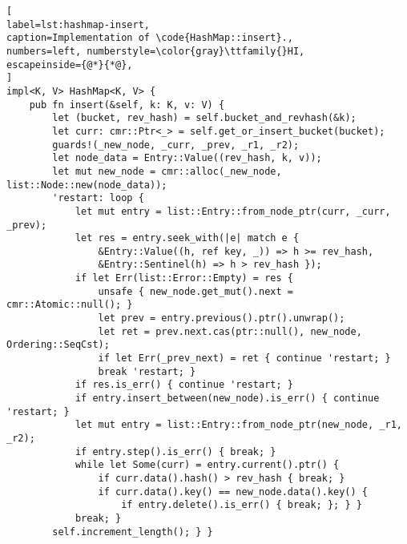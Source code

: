 \begin{lstlisting}[
label=lst:hashmap-insert,
caption=Implementation of \code{HashMap::insert}.,
numbers=left, numberstyle=\color{gray}\ttfamily{}HI,
escapeinside={@*}{*@},
]
impl<K, V> HashMap<K, V> {
    pub fn insert(&self, k: K, v: V) {
        let (bucket, rev_hash) = self.bucket_and_revhash(&k);
        let curr: cmr::Ptr<_> = self.get_or_insert_bucket(bucket);
        guards!(_new_node, _curr, _prev, _r1, _r2);
        let node_data = Entry::Value((rev_hash, k, v));
        let mut new_node = cmr::alloc(_new_node, list::Node::new(node_data));
        'restart: loop {
            let mut entry = list::Entry::from_node_ptr(curr, _curr, _prev);
            let res = entry.seek_with(|e| match e {
                &Entry::Value((h, ref key, _)) => h >= rev_hash,
                &Entry::Sentinel(h) => h > rev_hash });
            if let Err(list::Error::Empty) = res {
                unsafe { new_node.get_mut().next = cmr::Atomic::null(); }
                let prev = entry.previous().ptr().unwrap();
                let ret = prev.next.cas(ptr::null(), new_node, Ordering::SeqCst);
                if let Err(_prev_next) = ret { continue 'restart; }
                break 'restart; }
            if res.is_err() { continue 'restart; }
            if entry.insert_between(new_node).is_err() { continue 'restart; }
            let mut entry = list::Entry::from_node_ptr(new_node, _r1, _r2);
            if entry.step().is_err() { break; }
            while let Some(curr) = entry.current().ptr() {
                if curr.data().hash() > rev_hash { break; }
                if curr.data().key() == new_node.data().key() {
                    if entry.delete().is_err() { break; }; } }
            break; }
        self.increment_length(); } }
\end{lstlisting}
